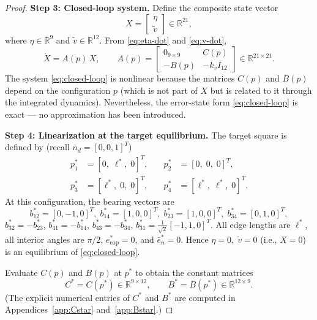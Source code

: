 \begin{proof}
\medskip\noindent\textbf{Step 3: Closed-loop system.}\quad
Define the composite state vector
\begin{equation}
X=\begin{bmatrix}\eta \\ \tilde v\end{bmatrix}\in\mathbb R^{21},
\label{eq:X-def}
\end{equation}
where \(\eta\in\mathbb R^{9}\) and \(\tilde v\in\mathbb R^{12}\). From \eqref{eq:eta-dot} and \eqref{eq:v-dot},
\begin{equation}
\boxed{\dot X = A(p)\,X},\qquad
A(p)=\begin{bmatrix}
0_{9\times 9} & C(p)\\[2pt]
-B(p) & -k_v I_{12}
\end{bmatrix}\in\mathbb R^{21\times 21}.
\label{eq:closed-loop}
\end{equation}
The system \eqref{eq:closed-loop} is nonlinear because the matrices \(C(p)\) and \(B(p)\) depend on the configuration \(p\) (which is not part of \(X\) but is related to it through the integrated dynamics). Nevertheless, the error-state form \eqref{eq:closed-loop} is exact — no approximation has been introduced.

\medskip\noindent\textbf{Step 4: Linearization at the target equilibrium.}\quad
The target square is defined by (recall \(\bar n_d=[0,0,1]^{T}\))
\begin{equation}
\begin{aligned}
p_1^*&=[0,\;\ell^*,\;0]^{T}, &\quad p_2^*&=[0,\;0,\;0]^{T},\\
p_3^*&=[\ell^*,\;0,\;0]^{T}, &\quad p_4^*&=[\ell^*,\;\ell^*,\;0]^{T}.
\end{aligned}
\label{eq:target-square}
\end{equation}
At this configuration, the bearing vectors are
\begin{equation}
\label{eq:target-bearings}
b_{12}^*=[0,-1,0]^{T},\; b_{14}^*=[1,0,0]^{T},\;
b_{23}^*=[1,0,0]^{T},\; b_{34}^*=[0,1,0]^{T},
\end{equation}
\(b_{32}^*=-b_{23}^*\), \(b_{41}^*=-b_{14}^*\), \(b_{43}^*=-b_{34}^*\), \(b_{31}^*=\frac{1}{\sqrt2}[-1,1,0]^{T}\). All edge lengths are \(\ell^*\), all interior angles are \(\pi/2\), \(e_{\mathrm{cop}}^*=0\), and \(\bar e_n^*=0\). Hence \(\eta=0,\;\tilde v=0\) (i.e., \(X=0\)) is an equilibrium of \eqref{eq:closed-loop}.

Evaluate \(C(p)\) and \(B(p)\) at \(p^*\) to obtain the constant matrices
\begin{equation}
C^*=C(p^*)\in\mathbb R^{9\times 12},\qquad
B^*=B(p^*)\in\mathbb R^{12\times 9}.
\label{eq:Cstar-Bstar}
\end{equation}
(The explicit numerical entries of \(C^*\) and \(B^*\) are computed in Appendices~\ref{app:Cstar} and~\ref{app:Bstar}.)


\end{proof}
